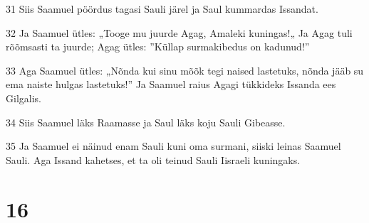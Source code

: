 \par 31 Siis Saamuel pöördus tagasi Sauli järel ja Saul kummardas Issandat.
\par 32 Ja Saamuel ütles: „Tooge mu juurde Agag, Amaleki kuningas!„ Ja Agag tuli rõõmsasti ta juurde; Agag ütles: ”Küllap surmakibedus on kadunud!”
\par 33 Aga Saamuel ütles: „Nõnda kui sinu mõõk tegi naised lastetuks, nõnda jääb su ema naiste hulgas lastetuks!” Ja Saamuel raius Agagi tükkideks Issanda ees Gilgalis.
\par 34 Siis Saamuel läks Raamasse ja Saul läks koju Sauli Gibeasse.
\par 35 Ja Saamuel ei näinud enam Sauli kuni oma surmani, siiski leinas Saamuel Sauli. Aga Issand kahetses, et ta oli teinud Sauli Iisraeli kuningaks.

\chapter{16}

